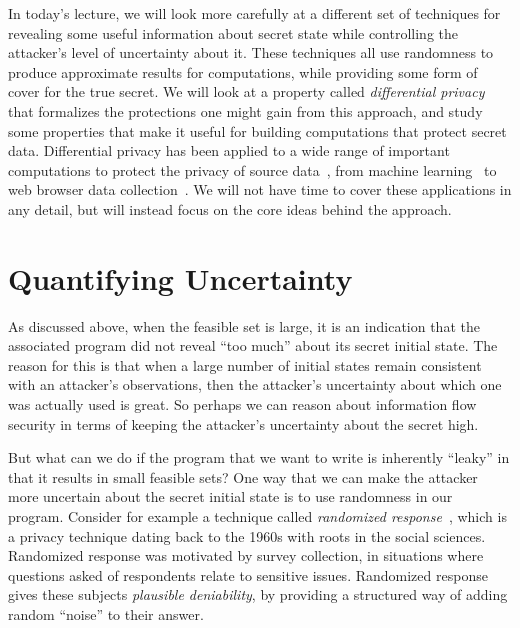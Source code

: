 \documentclass[11pt]{article}
\begin{document}
In today's lecture, we will look more carefully at a different set of techniques
for revealing some useful information about secret state while controlling the
attacker's level of uncertainty about it. These techniques all use randomness to
produce approximate results for computations, while providing some form of cover
for the true secret. We will look at a property called \emph{differential
  privacy}~\citep{Dwork06icalp} that formalizes the protections one might gain
from this approach, and study some properties that make it useful for building
computations that protect secret data. Differential privacy has been applied to
a wide range of important computations to protect the privacy of source
data~\citep{Dwork14fttcs}, from machine learning~\citep{Chaudhuri11jmlr} to web browser
data collection~\citep{Erlingsson14ccs}. We will not have time to cover these
applications in any detail, but will instead focus on the core ideas behind the
approach.

\section{Quantifying Uncertainty}

As discussed above, when the feasible set is large, it is an indication that the
associated program did not reveal ``too much'' about its secret initial
state. The reason for this is that when a large number of initial states remain
consistent with an attacker's observations, then the attacker's uncertainty
about which one was actually used is great. So perhaps we can reason about
information flow security in terms of keeping the attacker's uncertainty about
the secret high.

But what can we do if the program that we want to write is inherently ``leaky''
in that it results in small feasible sets? One way that we can make the attacker
more uncertain about the secret initial state is to use randomness in our
program. Consider for example a technique called \emph{randomized
  response}~\citep{Warner65jasa}, which is a privacy technique dating back to the
1960s with roots in the social sciences. Randomized response was motivated by
survey collection, in situations where questions asked of respondents relate to
sensitive issues. Randomized response gives these subjects \emph{plausible
  deniability}, by providing a structured way of adding random ``noise'' to
their answer.
\end{document}
